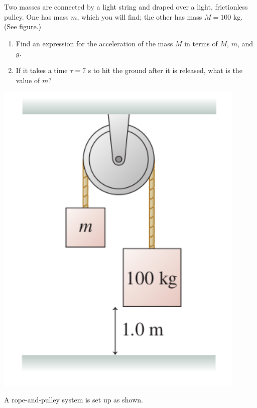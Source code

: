 \documentclass[12pt]{article}
\begin{document}
\begin{enumerate}
\bigskip

  \begin{minipage}{0.7\textwidth}
\item Two masses are connected by a light string and draped over a light, frictionless pulley. One has mass $m$, which you will find; the other has mass $M=100$ kg. (See figure.)
   
\begin{enumerate}
\item Find an expression for the acceleration of the mass $M$ in terms of $M$, $m$,
and $g$.
\item If it takes a time $\tau=7$ s to hit the ground after it is released, what is
the value of $m$? 
\end{enumerate}
  \end{minipage}
  \begin{minipage}{0.3\textwidth}
\centerline{\includegraphics[width=0.9\textwidth]{problem738.png}}
  \end{minipage}

\newpage

\bigskip

  \begin{minipage}{0.6\textwidth}
\item A rope-and-pulley system is set up as shown.
   

\end{minipage}
\end{enumerate}
\end{document}
